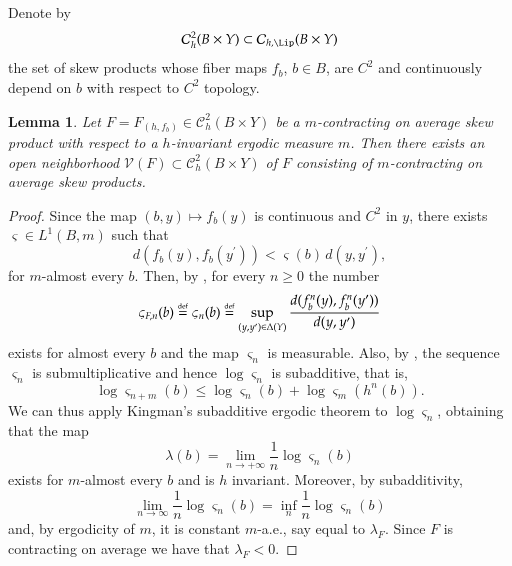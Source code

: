 \documentclass[11pt,reqno]{amsart}
\theoremstyle{plain}
\newtheorem{lemma}[theorem]{Lemma}
\newtheorem*{theorem A}{Theorem A}
\newtheorem*{theorem B}{Theorem B}
\newtheorem*{theorem C}{Theorem C}
\newtheorem*{theorem 1}{Theorem 1}
\newtheorem*{theorem 2}{Theorem 2}
\newtheorem*{theorem 3}{Theorem 3}
\newcommand{\eqdef}{\stackrel{\scriptscriptstyle\rm def}{=}}
\numberwithin{equation}{section}
\begin{document}
Denote by
\begin{equation}\label{ccc}
 \mathcal{C}^2_h(B \times Y)\subset \mathcal{C}_{h, \Lip} (B\times Y)
\end{equation}
the set of skew products whose fiber maps $f_b$, $b \in B$, are $C^2$ and continuously depend on $b$ with respect to $C^2$ topology.

\begin{lemma}\label{cor0}
Let $F=F_{(h,f_b)} \in \mathcal{C}^2_h(B \times Y)$ be a $m$-contracting on average skew product with respect to a $h$-invariant ergodic measure $m$.
Then there exists an open neighborhood $\mathcal{V}(F) \subset \mathcal{C}^2_h(B \times Y)$ of $F$ consisting of $m$-contracting on average skew products.
\end{lemma}

\begin{proof}
Since the map $(b,y)\mapsto f_b(y)$ is continuous and $C^2$ in $y$, there exists $\varsigma \in L^1(B,m)$ such that
\begin{equation*}
    d(f_b(y),f_b(y^{\prime}))<\varsigma(b)\,d(y,y^{\prime}),
\end{equation*}
for $m$-almost every $b$.
Then, by \cite[Lem.~5.1]{stark1999regularity}, for every $n\geq 0$ the number
\begin{equation}\label{n-lya}
\varsigma_{{F},n}(b)\eqdef \varsigma_n(b) \eqdef \sup_{(y,y^{\prime})\in \Delta (Y)}\frac{d(f_b^n(y) , f_b^n(y^{\prime}))}{d(y,y^{\prime})}
\end{equation}
exists for almost every $b$ and the map $\varsigma_n$ is measurable.
Also, by \cite[Lem.~5.3]{stark1999regularity}, the sequence $\varsigma_n$ is submultiplicative and hence $\log \varsigma_n$ is subadditive, that is,
$$
\log \varsigma_{n+m}(b)\leq \log \varsigma_n(b)+ \log \varsigma_m(h^n(b)).
$$
We can thus apply Kingman's subadditive ergodic theorem \cite[Thm.~5.4]{krengel2011ergodic} to $\log \varsigma_n$, obtaining that the map
\begin{equation}\label{lya}
\lambda(b)=\lim_{n \to +\infty}\frac{1}{n}\log \varsigma_n(b)
\end{equation}
exists for $m$-almost every $b$ and is $h$ invariant. Moreover, by subadditivity,
\begin{equation}\label{44}
\lim_{n \to \infty}\frac{1}{n}\log \varsigma_n(b)= \inf_{n}\frac{1}{n}\log \varsigma_n(b)
\end{equation}
and, by ergodicity of $m$, it is constant $m$-a.e., say equal to $\lambda_{F}$.
Since ${F}$ is contracting on average we have that $\lambda_{{F}} <0$.

\end{proof}
\end{document}
